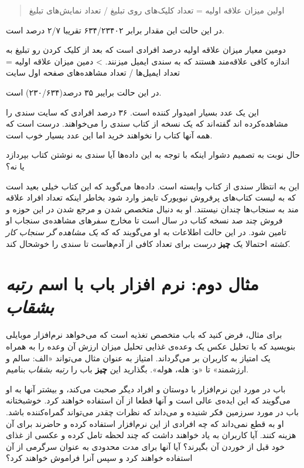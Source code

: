 \begin{quote}
اولین میزان علاقه اولیه = تعداد کلیک‌های روی تبلیغ / تعداد نمایش‌های
تبلیغ
\end{quote}

در این حالت این مقدار برابر ۶۳۴/۲۳۴۰۲ تقریبا ۲/۷ درصد است.

دومین معیار میزان علاقه اولیه درصد افرادی است که بعد از کلیک کردن رو
تبلیغ به اندازه کافی علاقه‌مند هستند که به سندی ایمیل میز‌نند.
\textgreater{} دمین میزان علاقه اولیه = تعداد ایمیل‌ها / تعداد
مشاهده‌های صفحه اول سایت

در این حالت برایبر ۳۵ درصد(۲۳۰/۶۳۴) است.

این یک عدد بسیار امیدوار کننده است. ۳۶ درصد افرادی که سایت سندی را
مشاهده‌کرده اند گفته‌اند که یک نسخه از کتاب سندی را می‌خواهند. درست است
که همه آنها کتاب را نخواهند خرید اما این عدد بسیار خوب است.

حال نوبت به تصمیم دشوار اینکه با توجه به این داده‌ها آیا سندی به نوشتن
کتاب بپردازد یا نه؟

این به انتظار سندی از کتاب وابسته است. داده‌ها می‌گوید که این کتاب خیلی
بعید است که به لیست کتاب‌های پرفروش نیویورک تایمز وارد شود بخاطر اینکه
تعداد افراد علاقه مند به سنجاب‌ها چندان نیستند. او به دنبال متخصص شدن و
مرجع شدن در این حوزه و فروش چند صد نسخه کتاب در سال است تا مخارج سفرهای
مشاهده‌ی سنجاب او تامین شود. در این حالت اطلاعات به او می‌گویند که که
\emph{یک مشاهده گر سنجاب کار کشته} احتمالا یک \textbf{چیز} \emph{درست}
برای تعداد کافی از آدم‌هاست تا سندی را خوشحال کند.

\section{مثال دوم: نرم افزار باب با اسم \emph{رتبه
بشقاب}}\label{ux645ux62bux627ux644-ux62fux648ux645-ux646ux631ux645-ux627ux641ux632ux627ux631-ux628ux627ux628-ux628ux627-ux627ux633ux645-ux631ux62aux628ux647-ux628ux634ux642ux627ux628}

برای مثال، فرض کنید که باب متخصص تغذیه است که می‌خواهد نرم‌افزار موبایلی
بنویسید که با تحلیل عکس یک وعده‌ی غذایی تحلیل میزان ارزش آن وعده را به
همراه یک امتیاز به کاربران بر می‌گرداند. امتیاز به عنوان مثال می‌تواند
«الف: سالم و ارزشمند» تا «و: هله، هوله». بگذارید این \textbf{چیز} باب را
\emph{رتبه بشقاب} بنامیم.

باب در مورد این نرم‌افزار با دوستان و افراد دیگر صحبت می‌کند، و بیشتر
آنها به او می‌گویند که این ایده‌ی عالی است و آنها قطعا از آن استفاده
خواهند کرد. خوشبختانه باب در مورد سرزمین فکر شنیده و می‌داند که نظرات
چقدر می‌تواند گمراه‌کننده باشد. او به قطع نمی‌داند که چه افرادی از این
نرم‌افزار استفاده کرده و حاضرند برای آن هزینه کنند. آیا کاربران به یاد
خواهند داشت که چند لحظه تامل کرده و عکسی از غذای خود قبل از خوردن آن
بگیرند؟ آیا آنها برای مدت محدودی به عنوان سرگرمی از آن استفاده خواهند
کرد و سپس آنرا فراموش خواهند کرد؟

